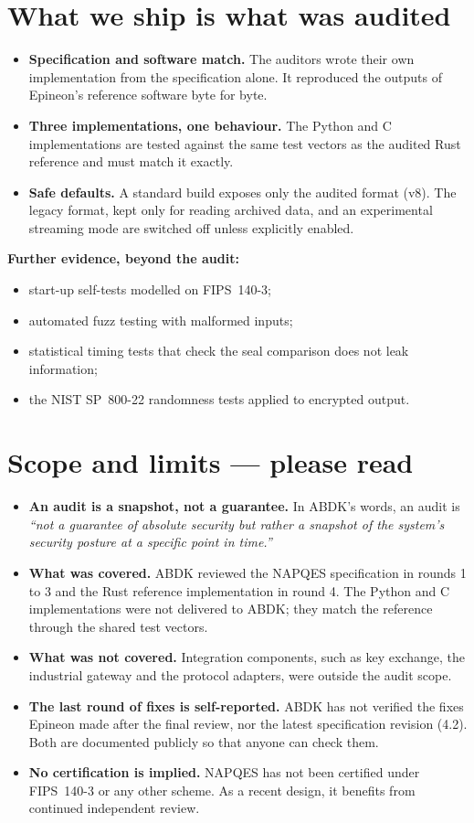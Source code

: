 ﻿\documentclass[11pt,a4paper]{article}
\begin{document}
\section{What we ship is what was audited}
\begin{itemize}
  \item \textbf{Specification and software match.} The auditors wrote their own implementation
        from the specification alone. It reproduced the outputs of Epineon's reference software
        byte for byte.
  \item \textbf{Three implementations, one behaviour.} The Python and C implementations are
        tested against the same test vectors as the audited Rust reference and must match it
        exactly.
  \item \textbf{Safe defaults.} A standard build exposes only the audited format (v8). The legacy
        format, kept only for reading archived data, and an experimental streaming mode are
        switched off unless explicitly enabled.
\end{itemize}
\textbf{Further evidence, beyond the audit:}
\begin{itemize}
  \item start-up self-tests modelled on FIPS~140-3;
  \item automated fuzz testing with malformed inputs;
  \item statistical timing tests that check the seal comparison does not leak information;
  \item the NIST SP~800-22 randomness tests applied to encrypted output.
\end{itemize}

\section{Scope and limits --- please read}
\begin{itemize}
  \item \textbf{An audit is a snapshot, not a guarantee.} In ABDK's words, an audit is
        \emph{``not a guarantee of absolute security but rather a snapshot of the system's
        security posture at a specific point in time.''}
  \item \textbf{What was covered.} ABDK reviewed the NAPQES specification in rounds 1 to 3 and
        the Rust reference implementation in round 4. The Python and C implementations were not
        delivered to ABDK; they match the reference through the shared test vectors.
  \item \textbf{What was not covered.} Integration components, such as key exchange, the
        industrial gateway and the protocol adapters, were outside the audit scope.
  \item \textbf{The last round of fixes is self-reported.} ABDK has not verified the fixes
        Epineon made after the final review, nor the latest specification revision (4.2). Both
        are documented publicly so that anyone can check them.
  \item \textbf{No certification is implied.} NAPQES has not been certified under FIPS~140-3 or
        any other scheme. As a recent design, it benefits from continued independent review.
\end{itemize}
\end{document}

